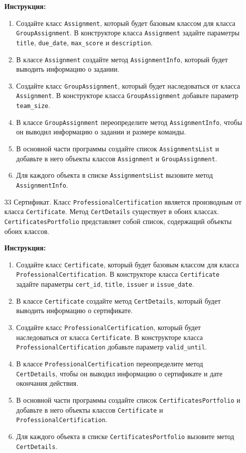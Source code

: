 \begin{enumerate}
\textbf{Инструкция:}
\begin{enumerate}
    \item Создайте класс \texttt{Assignment}, который будет базовым классом для класса \texttt{GroupAssignment}. В конструкторе класса \texttt{Assignment} задайте параметры \texttt{title}, \texttt{due\_date}, \texttt{max\_score} и \texttt{description}.
    \item В классе \texttt{Assignment} создайте метод \texttt{AssignmentInfo}, который будет выводить информацию о задании.
    \item Создайте класс \texttt{GroupAssignment}, который будет наследоваться от класса \texttt{Assignment}. В конструкторе класса \texttt{GroupAssignment} добавьте параметр \texttt{team\_size}.
    \item В классе \texttt{GroupAssignment} переопределите метод \texttt{AssignmentInfo}, чтобы он выводил информацию о задании и размере команды.
    \item В основной части программы создайте список \texttt{AssignmentsList} и добавьте в него объекты классов \texttt{Assignment} и \texttt{GroupAssignment}.
    \item Для каждого объекта в списке \texttt{AssignmentsList} вызовите метод \texttt{AssignmentInfo}.
\end{enumerate}

\item[33]
Сертификат. Класс \texttt{ProfessionalCertification} является производным от класса \texttt{Certificate}. Метод \texttt{CertDetails} существует в обоих классах. \texttt{CertificatesPortfolio} представляет собой список, содержащий объекты обоих классов.

\textbf{Инструкция:}
\begin{enumerate}
    \item Создайте класс \texttt{Certificate}, который будет базовым классом для класса \texttt{ProfessionalCertification}. В конструкторе класса \texttt{Certificate} задайте параметры \texttt{cert\_id}, \texttt{title}, \texttt{issuer} и \texttt{issue\_date}.
    \item В классе \texttt{Certificate} создайте метод \texttt{CertDetails}, который будет выводить информацию о сертификате.
    \item Создайте класс \texttt{ProfessionalCertification}, который будет наследоваться от класса \texttt{Certificate}. В конструкторе класса \texttt{ProfessionalCertification} добавьте параметр \texttt{valid\_until}.
    \item В классе \texttt{ProfessionalCertification} переопределите метод \texttt{CertDetails}, чтобы он выводил информацию о сертификате и дате окончания действия.
    \item В основной части программы создайте список \texttt{CertificatesPortfolio} и добавьте в него объекты классов \texttt{Certificate} и \texttt{ProfessionalCertification}.
    \item Для каждого объекта в списке \texttt{CertificatesPortfolio} вызовите метод \texttt{CertDetails}.
\end{enumerate}


\end{enumerate}
